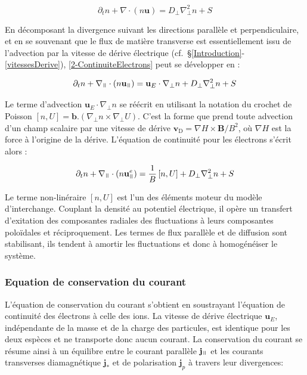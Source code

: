 \begin{refsection}
\begin{equation}
\label{2-ContinuiteElectrons}
\partial_t n + \nabla\cdot(n\mathbf{u}) = D_\perp\nabla^2_\perp n + S
\end{equation}

En décomposant la divergence suivant les directions parallèle et
perpendiculaire, et en se souvenant que le flux de matière transverse est
essentiellement issu de l'advection par la vitesse de dérive électrique
(cf.~§\ref{Introduction}-\ref{vitessesDerive}), \eqref{2-ContinuiteElectrons} peut se développer en :

\begin{equation}
\label{2-ContinuiteElectrons2}
\partial_t n + \nabla_\para\cdot(n\mathbf{u}_{\para}) =
\mathbf{u}_E\cdot\nabla_\perp n + D_\perp\nabla^2_\perp n + S
\end{equation}

Le terme d'advection $\mathbf{u}_E\cdot\nabla_\perp
n$ se réécrit en utilisant la notation
du crochet de Poisson $[n,U]=\mathbf{b}.(\nabla_\perp n\times\nabla_\perp U)$.
C'est la forme que prend toute advection d'un champ scalaire par une vitesse de
dérive $\mathbf{v}_\text{D}=\nabla H\times\mathbf{B}/B^2$, où $\nabla H$ est la
force à l'origine de la dérive. L'équation de continuité pour les électrons
s'écrit alors :

\begin{equation}
\label{2-eqContinuiteFinale}
\partial_t n + \nabla_{\para}\cdot(n\mathbf{u}^e_{\para}) =
\frac{1}{B}\left[n,U\right] + D_\perp\nabla^2_\perp n + S
\end{equation}

Le terme non-linéraire $[n,U]$ est l'un des éléments moteur du modèle
d'interchange. Couplant la densité au potentiel électrique, il opère un
transfert d'exitation des composantes radiales des fluctuations à leurs
composantes poloïdales et réciproquement. Les termes de flux parallèle et de
diffusion sont stabilisant, ils tendent à
amortir les fluctuations et donc à homogénéiser le système.

\subsubsection{Equation de conservation du courant}
L'équation de conservation du courant s'obtient en soustrayant l'équation de
continuité des électrons à celle des ions. La vitesse de dérive électrique
$\mathbf{u}_E$, indépendante de la masse et de la charge des particules,
est identique pour les deux espèces et ne transporte donc aucun courant. 
La conservation du courant se résume ainsi à un équilibre entre le courant
parallèle $\mathbf{j}_\para$ et les courants transverses diamagnétique
$\mathbf{j}_*$ et de polarisation $\mathbf{j}_p$ à travers leur
divergences:


\end{refsection}
